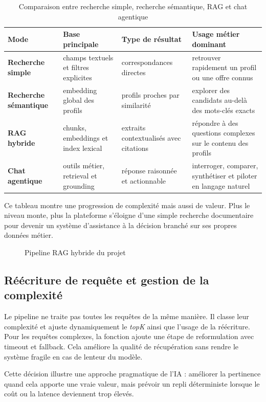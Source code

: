 \begin{table}[H]
  \centering
  \caption{Comparaison entre recherche simple, recherche sémantique, RAG et chat agentique}
  \begin{tabularx}{\textwidth}{>{\bfseries}p{2.8cm}p{2.8cm}X X}
    \toprule
    Mode & Base principale & Type de résultat & Usage métier dominant \\
    \midrule
    Recherche simple & champs textuels et filtres explicites & correspondances directes & retrouver rapidement un profil ou une offre connus \\
    Recherche sémantique & embedding global des profils & profils proches par similarité & explorer des candidats au-delà des mots-clés exacts \\
    RAG hybride & chunks, embeddings et index lexical & extraits contextualisés avec citations & répondre à des questions complexes sur le contenu des profils \\
    Chat agentique & outils métier, retrieval et grounding & réponse raisonnée et actionnable & interroger, comparer, synthétiser et piloter en langage naturel \\
    \bottomrule
  \end{tabularx}
\end{table}

Ce tableau montre une progression de complexité mais aussi de valeur. Plus le niveau monte, plus la plateforme s'éloigne d'une simple recherche documentaire pour devenir un système d'assistance à la décision branché sur ses propres données métier.


\begin{figure}[H]
  \centering
  \caption{Pipeline RAG hybride du projet}
\end{figure}

\subsection{Réécriture de requête et gestion de la complexité}
Le pipeline ne traite pas toutes les requêtes de la même manière. Il classe leur complexité et ajuste dynamiquement le \textit{topK} ainsi que l'usage de la réécriture. Pour les requêtes complexes, la fonction  ajoute une étape de reformulation avec timeout et fallback. Cela améliore la qualité de récupération sans rendre le système fragile en cas de lenteur du modèle.

Cette décision illustre une approche pragmatique de l'IA : améliorer la pertinence quand cela apporte une vraie valeur, mais prévoir un repli déterministe lorsque le coût ou la latence deviennent trop élevés.

